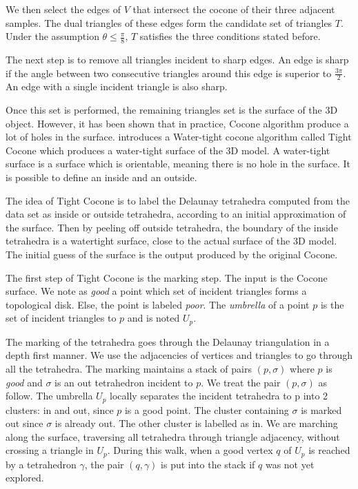 \documentclass[12pt]{article}
\begin{document}
We then select the edges of $V$ that intersect the cocone of their three adjacent samples. The dual triangles of these edges form the candidate set of triangles $T$. Under the assumption $\theta\le\frac{\pi}{8}$, $T$ satisfies the three conditions stated before.

The next step is to remove all triangles incident to sharp edges. An edge is sharp if the angle between two consecutive triangles around this edge is superior to $\frac{3\pi}{2}$. An edge with a single incident triangle is also sharp.

Once this set is performed, the remaining triangles set is the surface of the 3D object. However, it has been shown that in practice, Cocone algorithm produce a lot of holes in the surface. \cite{Tightcocone} introduces a Water-tight cocone algorithm called Tight Cocone which produces a water-tight surface of the 3D model. A water-tight surface is a surface which is orientable, meaning there is no hole in the surface. It is possible to define an inside and an outside.

The idea of Tight Cocone is to label the Delaunay tetrahedra computed from the data set as inside or outside tetrahedra, according to an initial approximation of the surface. Then by peeling off outside tetrahedra, the boundary of the inside tetrahedra is a watertight surface, close to the actual surface of the 3D model. The initial guess of the surface is the output produced by the original Cocone.

The first step of Tight Cocone is the marking step. The input is the Cocone surface. We note as \emph{good} a point which set of incident triangles forms a topological disk. Else, the point is labeled \emph{poor}. The \emph{umbrella} of a point $p$ is the set of incident triangles to $p$ and is noted $U_p$.

The marking of the tetrahedra goes through the Delaunay triangulation in a depth first manner. We use the adjacencies of vertices and triangles to go through all the tetrahedra. The marking maintains a stack of pairs $(p, \sigma)$ where $p$ is \emph{good} and $\sigma$ is an out tetrahedron incident to $p$. We treat the pair $(p, \sigma)$ as follow. The umbrella $U_p$ locally separates the incident tetrahedra to p into 2 clusters: in and out, since $p$ is a good point. The cluster containing $\sigma$ is marked out since $\sigma$ is already out. The other cluster is labelled as in. We are marching along the surface, traversing all tetrahedra through triangle adjacency, without crossing a triangle in $U_p$. During this walk, when a good vertex $q$ of $U_p$ is reached by a tetrahedron $\gamma$, the pair $(q, \gamma)$ is put into the stack if $q$ was not yet explored.
\end{document}
